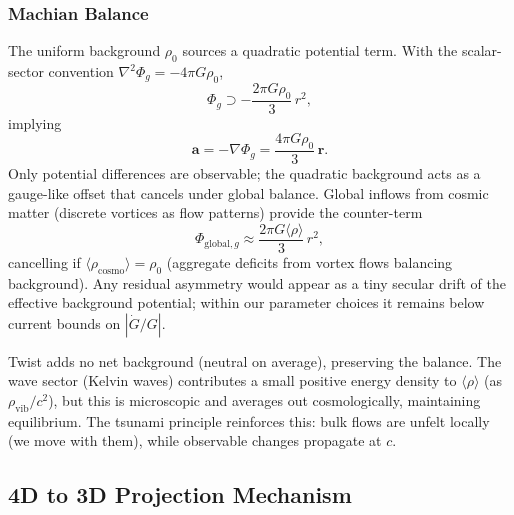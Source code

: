 \subsubsection{Machian Balance}
The uniform background $\rho_0$ sources a quadratic potential term. With the scalar-sector convention $\nabla^2 \Phi_g=-4\pi G\rho_0$,
\begin{equation}
\Phi_g \supset -\frac{2\pi G \rho_0}{3}\,r^2,
\end{equation}
implying
\begin{equation}
\mathbf{a} = -\nabla \Phi_g = \frac{4\pi G \rho_0}{3}\,\mathbf{r}.
\end{equation}
Only potential differences are observable; the quadratic background acts as a gauge-like offset that cancels under global balance. Global inflows from cosmic matter (discrete vortices as flow patterns) provide the counter-term
\begin{equation}
\Phi_{\text{global},g} \approx \frac{2\pi G \langle \rho \rangle}{3}\, r^2,
\end{equation}
cancelling if $\langle \rho_{\text{cosmo}} \rangle = \rho_0$ (aggregate deficits from vortex flows balancing background). Any residual asymmetry would appear as a tiny secular drift of the effective background potential; within our parameter choices it remains below current bounds on $|\dot G/G|$.

Twist adds no net background (neutral on average), preserving the balance. The wave sector (Kelvin waves) contributes a small positive energy density to $\langle \rho \rangle$ (as $\rho_{\text{vib}}/c^2$), but this is microscopic and averages out cosmologically, maintaining equilibrium. The tsunami principle reinforces this: bulk flows are unfelt locally (we move with them), while observable changes propagate at $c$.

\medskip
{}
\medskip

\subsection{4D to 3D Projection Mechanism}

